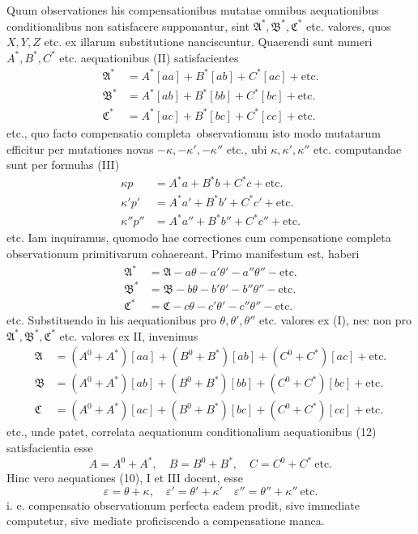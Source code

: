 Quum observationes his compensationibus mutatae omnibus aequationibus conditionalibus non satisfacere supponantur, sint \(\mathfrak A^*,\mathfrak B^*,\mathfrak C^*\) etc. valores, quos \(X,Y,Z\) etc. ex illarum substitutione nanciscuntur. Quaerendi sunt numeri \(A^*,B^*,C^*\) etc. aequationibus (II) satisfacientes
\[
\begin{aligned}
\mathfrak A^*&=A^*[aa]+B^*[ab]+C^*[ac]+\text{etc.}\\
\mathfrak B^*&=A^*[ab]+B^*[bb]+C^*[bc]+\text{etc.}\\
\mathfrak C^*&=A^*[ac]+B^*[bc]+C^*[cc]+\text{etc.}
\end{aligned}
\]
etc., quo facto compensatio completa\textperiodcentered\ observationum isto modo mutatarum efficitur per mutationes novas \(-\kappa,-\kappa',-\kappa''\) etc., ubi \(\kappa,\kappa',\kappa''\) etc. computandae sunt per formulas (III)
\[
\begin{aligned}
\kappa p&=A^*a+B^*b+C^*c+\text{etc.}\\
\kappa'p'&=A^*a'+B^*b'+C^*c'+\text{etc.}\\
\kappa''p''&=A^*a''+B^*b''+C^*c''+\text{etc.}
\end{aligned}
\]
etc. Iam inquiramus, quomodo hae correctiones cum compensatione completa
observationum primitivarum cohaereant. Primo manifestum est, haberi
\[
\begin{aligned}
\mathfrak A^*&=\mathfrak A-a\theta-a'\theta'-a''\theta''-\text{etc.}\\
\mathfrak B^*&=\mathfrak B-b\theta-b'\theta'-b''\theta''-\text{etc.}\\
\mathfrak C^*&=\mathfrak C-c\theta-c'\theta'-c''\theta''-\text{etc.}
\end{aligned}
\]
etc. Substituendo in his aequationibus pro \(\theta,\theta',\theta''\) etc. valores ex (I), nec non pro \(\mathfrak A^*,\mathfrak B^*,\mathfrak C^*\) etc. valores ex II, invenimus
\[
\begin{aligned}
\mathfrak A&=(A^0+A^*)[aa]+(B^0+B^*)[ab]+(C^0+C^*)[ac]+\text{etc.}\\
\mathfrak B&=(A^0+A^*)[ab]+(B^0+B^*)[bb]+(C^0+C^*)[bc]+\text{etc.}\\
\mathfrak C&=(A^0+A^*)[ac]+(B^0+B^*)[bc]+(C^0+C^*)[cc]+\text{etc.}
\end{aligned}
\]
etc., unde patet, correlata aequationum conditionalium aequationibus (12) satisfacientia esse
\[
A=A^0+A^*,\quad B=B^0+B^*,\quad C=C^0+C^*\ \text{etc.}
\]
Hinc vero aequationes (10), I et III docent, esse
\[
\varepsilon=\theta+\kappa,\quad\varepsilon'=\theta'+\kappa'\quad\varepsilon''=\theta''+\kappa''\ \text{etc.}
\]
i. e. compensatio observationum perfecta eadem prodit, sive immediate computetur, sive mediate proficiscendo a compensatione manca.

